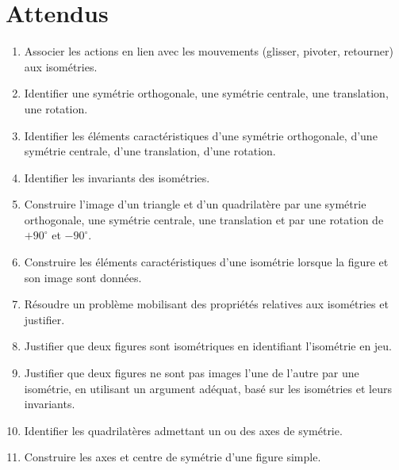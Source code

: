 \documentclass[../../syllabus_1.tex]{subfiles}
\begin{document}
\section*{Attendus}
\begin{enumerate}[label=\textbf{\arabic*.}]
    \item Associer les actions en lien avec les mouvements (glisser, pivoter, retourner) aux isométries.
    \item Identifier une symétrie orthogonale, une symétrie centrale, une translation, une rotation.
    \item Identifier les éléments caractéristiques d’une symétrie orthogonale, d’une symétrie centrale, d’une translation, d’une rotation.
    \item Identifier les invariants des isométries.
    \item Construire l’image d’un triangle et d’un quadrilatère par une symétrie orthogonale, une symétrie centrale, une translation et par une rotation de $+ 90^\circ $ et $- 90^\circ $.
    \item Construire les éléments caractéristiques d’une isométrie lorsque la figure et son image sont données.
    \item Résoudre un problème mobilisant des propriétés relatives aux isométries et justifier.
    \item Justifier que deux figures sont isométriques en identifiant l’isométrie en jeu.
    \item Justifier que deux figures ne sont pas images l’une de l’autre par une isométrie, en utilisant un argument adéquat, basé sur les isométries et leurs invariants.
    \item Identifier les quadrilatères admettant un ou des axes de symétrie.
    \item Construire les axes et centre de symétrie d’une figure simple.
\end{enumerate}
\end{document}
